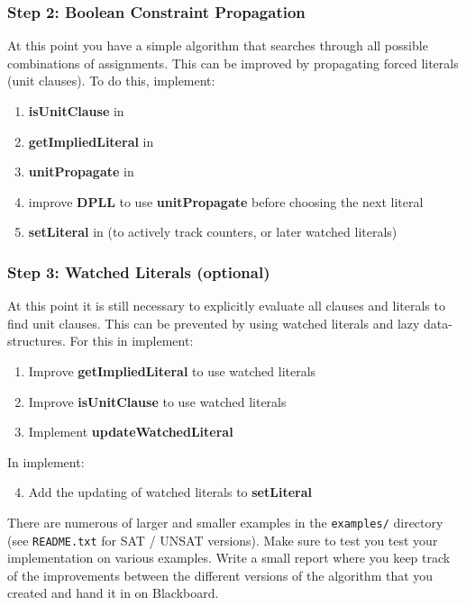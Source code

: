 \documentclass[12pt]{article}
\begin{document}
	\subsubsection*{Step 2: Boolean Constraint Propagation}
	At this point you have a simple algorithm that searches through all possible combinations of assignments. This can be improved by propagating forced literals (unit clauses).
	To do this, implement:
	\begin{enumerate}
		\item \textbf{isUnitClause} in 
		\item \textbf{getImpliedLiteral} in 
		\item \textbf{unitPropagate} in 
		\item improve \textbf{DPLL} to use \textbf{unitPropagate} before choosing the next literal
		\item \textbf{setLiteral} in  (to actively track counters, or later watched literals)
	\end{enumerate}
	
	\subsubsection*{Step 3: Watched Literals (optional)}
	At this point it is still necessary to explicitly evaluate all clauses and literals to find unit clauses.
	This can be prevented by using watched literals and lazy data-structures.
	For this in  implement:
	\begin{enumerate}
		\item Improve \textbf{getImpliedLiteral} to use watched literals
		\item Improve \textbf{isUnitClause} to use watched literals
		\item Implement \textbf{updateWatchedLiteral}
	\end{enumerate}
	In  implement:
	\begin{enumerate}
		\setcounter{enumi}{3}
		\item Add the updating of watched literals to \textbf{setLiteral}
	\end{enumerate}
	
There are numerous of larger and smaller examples in the \texttt{examples/}	 directory (see \texttt{README.txt} for SAT / UNSAT versions). Make sure to test you test your implementation on various examples.
Write a small report where you keep track of the improvements between
the different versions of the algorithm that you created and hand it in on Blackboard.
	
\end{document}
